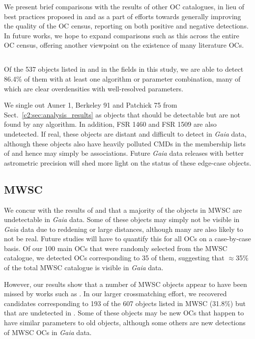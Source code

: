 We present brief comparisons with the results of other OC catalogues, in lieu of best practices proposed in \cite{cantat-gaudin_clusters_2020} and as a part of efforts towards generally improving the quality of the OC census, reporting on both positive and negative detections. In future works, we hope to expand comparisons such as this across the entire OC census, offering another viewpoint on the existence of many literature OCs.


\subsection{\cite{cantat-gaudin_clusters_2020}}

Of the 537 objects listed in \cite{cantat-gaudin_clusters_2020} and in the fields in this study, we are able to detect 86.4\% of them with at least one algorithm or parameter combination, many of which are clear overdensities with well-resolved parameters.

We single out Auner 1, Berkeley 91 and Patchick 75 from Sect.~\ref{c2:sec:analysis_results} as objects that should be detectable but are not found by any algorithm. In addition, FSR 1460 and FSR 1509 are also undetected. If real, these objects are distant and difficult to detect in \emph{Gaia} data, although these objects also have heavily polluted CMDs in the membership lists of \cite{cantat-gaudin_clusters_2020} and hence may simply be associations. Future \emph{Gaia} data releases with better astrometric precision will shed more light on the status of these edge-case objects.


\subsection{MWSC}

We concur with the results of \cite{cantat-gaudin_gaia_2018} and \cite{cantat-gaudin_clusters_2020} that a majority of the objects in MWSC are undetectable in \emph{Gaia} data. Some of these objects may simply not be visible in \emph{Gaia} data due to reddening or large distances, although many are also likely to not be real. Future studies will have to quantify this for all OCs on a case-by-case basis. Of our 100 main OCs that were randomly selected from the MWSC catalogue, we detected OCs corresponding to 35 of them, suggesting that $\approx$35\% of the total MWSC catalogue is visible in \emph{Gaia} data. 

However, our results show that a number of MWSC objects appear to have been missed by works such as \cite{cantat-gaudin_clusters_2020}. In our larger crossmatching effort, we recovered candidates corresponding to 193 of the 607 objects listed in MWSC (31.8\%) but that are undetected in \cite{cantat-gaudin_clusters_2020}. Some of these objects may be new OCs that happen to have similar parameters to old objects, although some others are new detections of MWSC OCs in \emph{Gaia} data.

